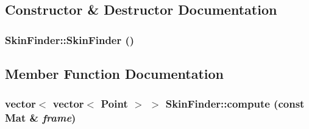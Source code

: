 \subsection{Constructor \& Destructor Documentation}
\hypertarget{class_skin_finder_aac7af0cb4507fc573997c4fb63ad21f0}{
\subsubsection[{SkinFinder}]{\setlength{\rightskip}{0pt plus 5cm}SkinFinder::SkinFinder ()}}
\label{class_skin_finder_aac7af0cb4507fc573997c4fb63ad21f0}


\subsection{Member Function Documentation}
\hypertarget{class_skin_finder_a407aba46cd098b2cd45f458470a1aeab}{
\subsubsection[{compute}]{\setlength{\rightskip}{0pt plus 5cm}vector$<$ vector$<$ Point $>$ $>$ SkinFinder::compute (const Mat \& {\em frame})}}
\label{class_skin_finder_a407aba46cd098b2cd45f458470a1aeab}


